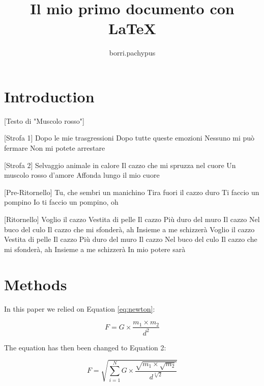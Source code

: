 \documentclass[12pt]{article} %
\title{Il mio primo documento con LaTeX}
\author{borri.pachypus}
\begin{document}

\maketitle

\tableofcontents

\section{Introduction} \label{sec:intro}
[Testo di "Muscolo rosso"]

[Strofa 1]
Dopo le mie trasgressioni
Dopo tutte queste emozioni
Nessuno mi può fermare
Non mi potete arrestare

[Strofa 2]
Selvaggio animale in calore
Il cazzo che mi spruzza nel cuore
Un muscolo rosso d'amore
Affonda lungo il mio cuore

[Pre-Ritornello]
Tu, che sembri un manichino
Tira fuori il cazzo duro
Ti faccio un pompino
Io ti faccio un pompino, oh

[Ritornello]
Voglio il cazzo
Vestita di pelle
Il cazzo
Più duro del muro
Il cazzo
Nel buco del culo
Il cazzo che mi sfonderà, ah
Insieme a me schizzerà
Voglio il cazzo
Vestita di pelle
Il cazzo
Più duro del muro
Il cazzo
Nel buco del culo
Il cazzo che mi sfonderà, ah
Insieme a me schizzerà
In mio potere sarà

\section{Methods} 
In this paper we relied on Equation \ref{eq:newton}:

\begin{equation}
F = G \times \frac{m_1 \times m_2}{d^2}
\label{eq:newton}
\end{equation}

The equation has then been changed to Equation 2:

\begin{equation}
F = \sqrt{\sum_{i=1}^{N} G \times \frac{\sqrt{m_1 \times \sqrt{m_2}}}{d^{\sqrt[3]{2}}}}
\end{equation}
\end{document}
